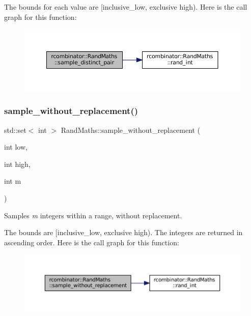 The bounds for each value are \mbox{[}inclusive\+\_\+low, exclusive high). Here is the call graph for this function\+:\nopagebreak
\begin{figure}[H]
\begin{center}
\leavevmode
\includegraphics[width=350pt]{classrcombinator_1_1RandMaths_aaa759efa3059b6793100cb6b6442f26d_cgraph}
\end{center}
\end{figure}
\mbox{\label{classrcombinator_1_1RandMaths_a2c31949c9ac03952cb0006e6a88e3d85}} 
\subsubsection{\texorpdfstring{sample\+\_\+without\+\_\+replacement()}{sample\_without\_replacement()}}
{\footnotesize\ttfamily std\+::set$<$ int $>$ Rand\+Maths\+::sample\+\_\+without\+\_\+replacement (\begin{DoxyParamCaption}\item[{int}]{low,  }\item[{int}]{high,  }\item[{int}]{m }\end{DoxyParamCaption})}



Samples {\itshape m} integers within a range, without replacement. 

The bounds are \mbox{[}inclusive\+\_\+low, exclusive high). The integers are returned in ascending order. Here is the call graph for this function\+:\nopagebreak
\begin{figure}[H]
\begin{center}
\leavevmode
\includegraphics[width=350pt]{classrcombinator_1_1RandMaths_a2c31949c9ac03952cb0006e6a88e3d85_cgraph}
\end{center}
\end{figure}
\mbox{\label{classrcombinator_1_1RandMaths_a183686140a9da18ad40c7e048ee8914e}} 
